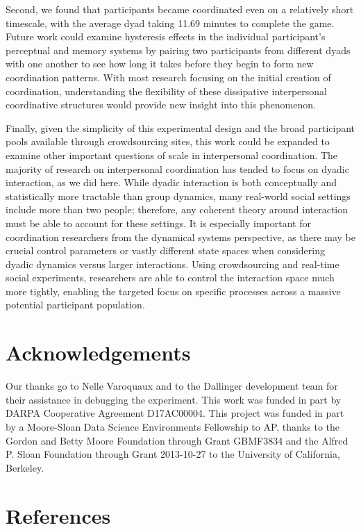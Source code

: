 \documentclass[10pt, letterpaper]{article}
\begin{document}
Second, we found that participants became coordinated even on a
relatively short timescale, with the average dyad taking 11.69 minutes
to complete the game. Future work could examine hysteresis effects in
the individual participant's perceptual and memory systems by pairing
two participants from different dyads with one another to see how long
it takes before they begin to form new coordination patterns. With most
research focusing on the initial creation of coordination, understanding
the flexibility of these dissipative interpersonal coordinative
structures would provide new insight into this phenomenon.

Finally, given the simplicity of this experimental design and the broad
participant pools available through crowdsourcing sites, this work could
be expanded to examine other important questions of scale in
interpersonal coordination. The majority of research on interpersonal
coordination has tended to focus on dyadic interaction, as we did here.
While dyadic interaction is both conceptually and statistically more
tractable than group dynamics, many real-world social settings include
more than two people; therefore, any coherent theory around interaction
must be able to account for these settings. It is especially important
for coordination researchers from the dynamical systems perspective, as
there may be crucial control parameters or vastly different state spaces
when considering dyadic dynamics versus larger interactions. Using
crowdsourcing and real-time social experiments, researchers are able to
control the interaction space much more tightly, enabling the targeted
focus on specific processes across a massive potential participant
population.

\section{Acknowledgements}\label{acknowledgements}

Our thanks go to Nelle Varoquaux and to the Dallinger development team
for their assistance in debugging the experiment. This work was funded
in part by DARPA Cooperative Agreement D17AC00004. This project was
funded in part by a Moore-Sloan Data Science Environments Fellowship to
AP, thanks to the Gordon and Betty Moore Foundation through Grant
GBMF3834 and the Alfred P. Sloan Foundation through Grant 2013-10-27 to
the University of California, Berkeley.

\section{References}\label{references}
\end{document}
